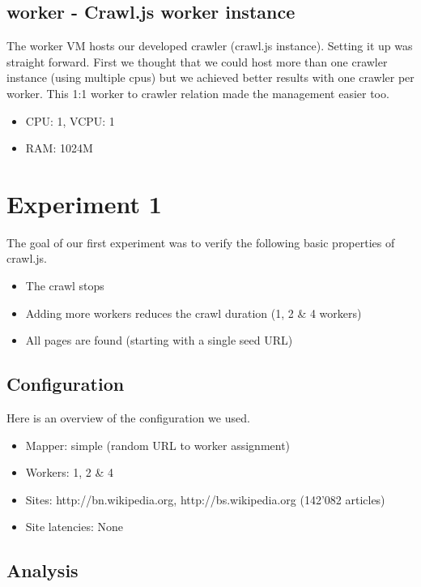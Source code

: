 \subsection{worker - Crawl.js worker instance}
The worker VM hosts our developed crawler (crawl.js instance). Setting it up was straight forward. First we thought that we could host more than one crawler instance (using multiple cpus) but we achieved better results with one crawler per worker. This 1:1 worker to crawler relation made the management easier too.

\begin{itemize}
  \item CPU: 1, VCPU: 1
  \item RAM: 1024M
\end{itemize}

\section{Experiment 1}

The goal of our first experiment was to verify the following basic properties of crawl.js.

\begin{itemize}
  \item The crawl stops
  \item Adding more workers reduces the crawl duration (1, 2 \& 4 workers)
  \item All pages are found (starting with a single seed URL)
\end{itemize}

\subsection{Configuration}

Here is an overview of the configuration we used.

\begin{itemize}
  \item Mapper: simple (random URL to worker assignment)
  \item Workers: 1, 2 \& 4
  \item Sites: http://bn.wikipedia.org, http://bs.wikipedia.org (142'082 articles)
  \item Site latencies: None
\end{itemize}

\subsection{Analysis}


